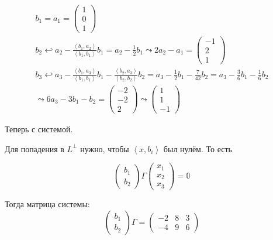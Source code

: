 \documentclass[12pt, a4paper]{article}
\begin{document}
    \begin{gather}
        b_1 = a_1 = \begin{pmatrix}
            1 \\ 0 \\ 1
        \end{pmatrix} \\
        b_2 \hookleftarrow a_2 - \frac{\left\langle b_1, a_2 \right\rangle}
        {\left\langle b_1, b_1 \right\rangle} b_1 = a_2 - \frac{1}{2} b_1 
        \leadsto 2 a_2 - a_1 = \begin{pmatrix}
            -1 \\ 2 \\ 1
        \end{pmatrix} \\
        b_3 \hookleftarrow  a_3 - \frac{\left\langle b_1, a_3 \right\rangle}
        {\left\langle b_1, b_1 \right\rangle} b_1 - \frac{\left\langle b_2, a_3 \right\rangle}
        {\left\langle b_2, b_2 \right\rangle} b_2 = a_3 - \frac{1}{2} b_1 - \frac{7}{42} b_2 
        = a_3 - \frac{3}{6} b_1 - \frac{1}{6} b_2 \\
        \leadsto 6 a_3 - 3 b_1 - b_2 
        = \begin{pmatrix}
            -2 \\ -2 \\ 2
        \end{pmatrix} \leadsto \begin{pmatrix}
            1 \\ 1 \\ -1
        \end{pmatrix}
    \end{gather}

    Теперь с системой.

    Для попадения в $L^{\perp}$ нужно, чтобы $\left\langle x, b_i \right\rangle$ был нулём.
    То есть

    \begin{equation}
        \begin{pmatrix}
            b_1 \\ b_2
        \end{pmatrix} \Gamma \begin{pmatrix}
            x_1 \\ x_2 \\ x_3
        \end{pmatrix} = \mathbb{0}
    \end{equation}

    Тогда матрица системы:
    \begin{equation}
        \begin{pmatrix}
            b_1 \\ b_2
        \end{pmatrix} \Gamma = \left(\begin{matrix}
            -2 & 8 & 3 \\
            -4 & 9 & 6
        \end{matrix}\right)
    \end{equation}
\end{document}
